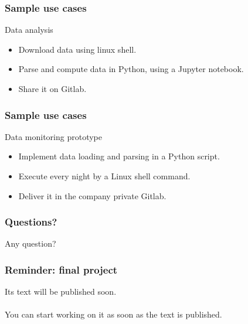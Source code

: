 \begin{frame}
\frametitle{Sample use cases}
   Data analysis
   \begin{itemize}
      \item Download data using linux shell.
      \item Parse and compute data in Python, using a Jupyter notebook.
      \item Share it on Gitlab.
   \end{itemize}
\end{frame}

\begin{frame}
\frametitle{Sample use cases}
   Data monitoring prototype
   \begin{itemize}
      \item Implement data loading and parsing in a Python script.
      \item Execute every night by a Linux shell command.
      \item Deliver it in the company private Gitlab.
   \end{itemize}
\end{frame}

\begin{frame}
\frametitle{Questions?}
   Any question?
\end{frame}

\begin{frame}
\frametitle{Reminder: final project}
   Its text will be published soon. \\
   \\
   You can start working on it as soon as the text is published.
\end{frame}



